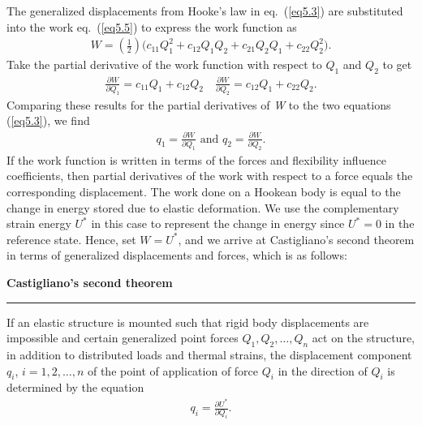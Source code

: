 \documentclass{AeroStructure-ERJohnson}
\begin{document}
The generalized displacements from Hooke's law in eq.~(\ref{eq5.3}) are substituted into the work eq.~(\ref{eq5.5}) to express the work function as
\begin{align*}
W=\left(\frac{1}{2}\right)\big(c_{11} Q_{1}^{2}+c_{12} Q_{1} Q_{2}+c_{21} Q_{2} Q_{1}+c_{22} Q_{2}^{2}\big).
\end{align*}
Take the partial derivative of the work function with respect to $Q_1$ and $Q_2$ to get
\begin{align*}
\frac{\partial W}{\partial Q_{1}}=c_{11} Q_{1}+c_{12} Q_{2} \quad \frac{\partial W}{\partial Q_{2}}=c_{12} Q_{1}+c_{22} Q_{2}.
\end{align*}
Comparing these results for the partial derivatives of \textit{W} to the two equations (\ref{eq5.3}), we find
\begin{align}\label{eq5.88}
q_{1}=\frac{\partial W}{\partial Q_{1}}\mbox{ and }q_{2}=\frac{\partial W}{\partial Q_{2}}.
\end{align}
If the work function is written in terms of the forces and flexibility influence coefficients, then partial derivatives of the work with respect to a force equals the corresponding displacement. The work done on a Hookean body is equal to the change in energy stored due to elastic deformation. We use the complementary strain energy $U^{*}$ in this case to represent the change in energy since $U^{*}=0$ in the reference state. Hence, set $W=U^{*}$, and we arrive at Castigliano's second theorem in terms of generalized displacements and forces, which is as follows:

\begin{framed}
\noindent\textbf{Castigliano's second theorem}\\
\hspace*{-10pt}\rule{37.45pc}{2pt}
If an elastic structure is mounted such that rigid body displacements are impossible and certain generalized point forces $Q_{1}, Q_{2}, \ldots, Q_{n}$ act on the structure, in addition to distributed loads and thermal strains, the displacement component $q_{i}$, $i=1,2, \ldots, n$ of the point of application of force $Q_{i}$ in the direction of $Q_{i}$ is determined by the equation\vspace*{-8pt}
\begin{align*}
q_{i}=\frac{\partial U^{*}}{\partial Q_{i}}.
\end{align*}\vspace*{-16pt}
\end{framed}\vspace*{-7pt}
\end{document}
